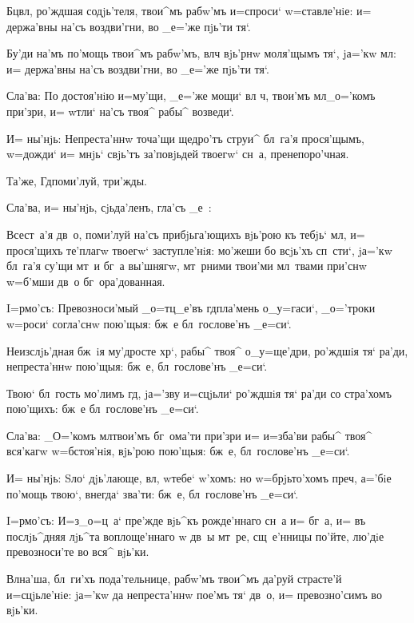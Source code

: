 Бц вл, ро'ждшая содjь'теля, твои^мъ рабw'мъ 
и=спроси` w=ставле'нiе: и= держа'вны на'съ воздви'гни, во 
_е='же пjь'ти тя`.

Бу'ди на'мъ по'мощь твои^мъ рабw'мъ, вл ч 
вjь'рнw моля'щымъ тя`, jа='кw мл: и= держа'вны 
на'съ воздви'гни, во _е='же пjь'ти тя`.

Сла'ва: По достоя'нiю и=му'щи, _е='же мощи` вл 
ч, твои'мъ мл _о='комъ при'зри, и= w\т тли` 
на'съ твоя^ рабы^ возведи`.

И= ны'нjь: Непреста'ннw точа'щи щедро'тъ струи^ 
бл~га'я прося'щымъ, w=дожди` и= мнjь` свjь'тъ за'повjьдей 
твоегw` сн~а, пренепоро'чная.

Та'же, Гд поми'луй, три'жды. 

Сла'ва, и= ны'нjь, сjьда'ленъ, гла'съ _е~:

Всест~а'я дв~о, поми'луй на'съ прибjьга'ющихъ вjь'рою 
къ тебjь` мл, и= прося'щихъ те'плагw твоегw` 
заступле'нiя: мо'жеши бо всjь'хъ сп~сти`, jа='кw бл~га'я 
су'щи мт~и бг~а вы'шнягw, мт~рними твои'ми мл~твами 
при'снw w=б'мши дв~о бг~ора'дованная.


I=рмо'съ: Превозноси'мый _о=тц_е'въ гд пла'мень 
о_у=гаси`, _о='троки w=роси` согла'снw пою'щыя: бж~е 
бл~гослове'нъ _е=си`.

Неизслjь'дная бж~iя му'дросте хр`, рабы^ твоя^ 
о_у=ще'дри, ро'ждшiя тя` ра'ди, непреста'ннw пою'щыя: 
бж~е, бл~гослове'нъ _е=си`.

Твою` бл~гость мо'лимъ гд, jа='зву и=сцjьли` 
ро'ждшiя тя` ра'ди со стра'хомъ пою'щихъ: бж~е 
бл~гослове'нъ _е=си`.

Сла'ва: _О='комъ мл твои'мъ бг~ома'ти при'зри 
и= и=зба'ви рабы^ твоя^ вся'кагw w=бстоя'нiя, вjь'рою 
пою'щыя: бж~е, бл~гослове'нъ _е=си`.

И= ны'нjь: Sло` дjь'лающе, вл, w\т тебе` 
w'хомъ: но w=брjьто'хомъ преч, а='бiе по'мощь 
твою`, внегда` зва'ти: бж~е, бл~гослове'нъ _е=си`.


I=рмо'съ: И=з\ъ _о=ц~а` пре'жде вjь^къ рожде'ннаго 
сн~а и= бг~а, и= въ послjь^дняя лjь^та воплоще'ннаго w\т 
дв~ы мт~ре, сщ~е'нницы по'йте, лю'дiе превозноси'те во 
вся^ вjь'ки.

Вл на'ша, бл~ги'хъ пода'тельнице, рабw'мъ твои^мъ 
да'руй страсте'й и=сцjьле'нiе: jа='кw да непреста'ннw 
пое'мъ тя` дв~о, и= превозно'симъ во вjь'ки.

